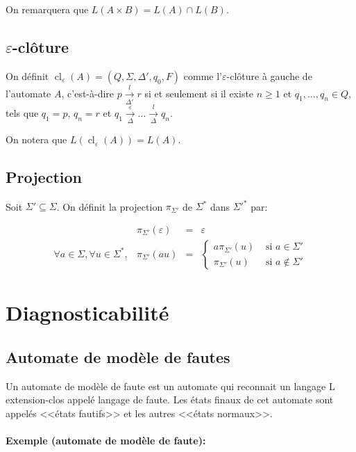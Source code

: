 \documentclass[10pt,a4paper]{article}
\begin{document}
On remarquera que $L(A\times B) = L(A) \cap L(B)$.

\subsection{$\varepsilon$-clôture}

On définit  $\operatorname{cl}_\varepsilon(A) = (Q, \Sigma, \Delta', q_0, F)$ comme l'$\varepsilon$-clôture \`a gauche de l'automate $A$, c'est-\`a-dire $p \underset{\Delta'}{\overset{l}{{\to}}} r$ si et seulement si il existe $n\ge 1$ et $q_1,\dots,q_n \in Q,$ tels que $q_1 = p$, $q_n = r$ et $q_1 \underset{\Delta}{\overset{\varepsilon}{{\to}}} \dots \underset{\Delta}{\overset{l}{{\to}}} q_n$.

On notera que $L(\operatorname{cl}_\varepsilon(A))=L(A)$.

\subsection{Projection}

Soit $\Sigma'\subseteq \Sigma$. On d\'efinit la projection $\pi_{\Sigma'}$ de $\Sigma^*$ dans $\Sigma'^*$ par:

$$\begin{array}{llll}
&\pi_{\Sigma'}(\varepsilon) &= &\varepsilon\\
\forall a \in \Sigma, \forall u \in \Sigma^*, &\pi_{\Sigma'}(au) &= &\left\{\begin{array}{ll}
a\pi_{\Sigma'}(u) &\text{ si } a \in \Sigma'\\
\pi_{\Sigma'}(u) &\text{ si } a \not\in \Sigma'
\end{array}\right.
\end{array}$$

\section{Diagnosticabilit\'e}

\subsection{Automate de modèle de fautes}
Un automate de modèle de faute est un automate qui reconnait un langage L extension-clos appelé langage de faute. Les états finaux de cet automate sont appelés <<\'etats fautifs>> et les autres <<\'etats normaux>>.
    
    \paragraph{Exemple (automate de mod\`ele de faute): }
    
\end{document}
